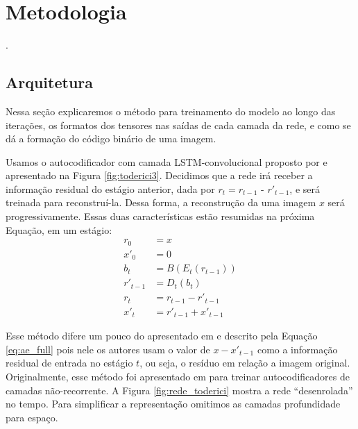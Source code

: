 \chapter{Metodologia}


.     

\section{Arquitetura}

Nessa seção explicaremos o método para treinamento do modelo ao longo das iterações, os formatos dos tensores nas saídas de cada camada da rede, e como se dá a formação do código binário de uma imagem.   

Usamos o autocodificador com camada LSTM-convolucional proposto por \cite{FullResolution2017Toderici} e apresentado na Figura \ref{fig:toderici3}. 
Decidimos que a rede irá receber a informação residual do estágio anterior, dada por $ r_t = r_{t-1}$ - $r'_{t-1}$, e será treinada para reconstruí-la. Dessa forma, a reconstrução da uma imagem $x$ será progressivamente. Essas duas características estão resumidas na próxima Equação, em um estágio:
\begin{equation}
\label{eq:model_1it}
\begin{aligned}
r_{0} &=x\\
x'_0  &=0 \\
b_{t} &= B(E_{t}(r_{t-1})) \\
r'_{t-1} &= D_{t}(b_{t}) \\
r_{t} &= r_{t-1}- r'_{t-1} \\
x'_t &= r'_{t-1} + x'_{t-1}  
\end{aligned}
\end{equation}

Esse método difere um pouco do apresentado em \cite{FullResolution2017Toderici} e descrito pela Equação \ref{eq:ae_full}  pois nele os autores usam o valor de $x-x'_{t-1}$ como a informação residual de entrada no estágio $t$, ou seja, o resíduo em relação a imagem original.
Originalmente, esse método foi apresentado em \cite{Variable2016Toderici} para treinar autocodificadores de camadas não-recorrente. 
A Figura \ref{fig:rede_toderici} mostra a rede ``desenrolada'' no tempo. Para simplificar a representação omitimos as camadas profundidade para espaço. 

